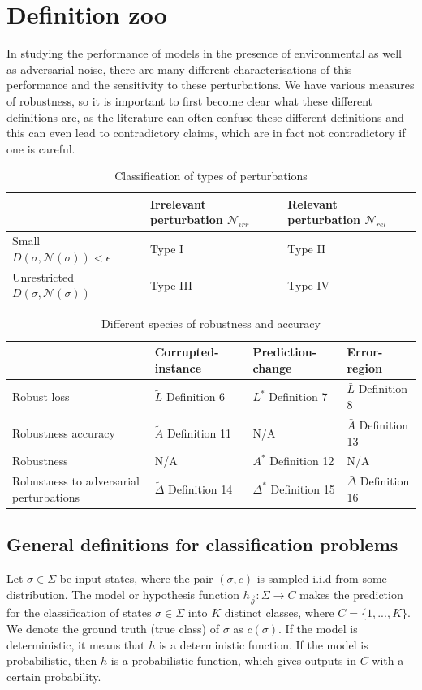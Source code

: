 \documentclass[onecolumn,prx, superscriptaddress,longbibliography,margin=1mm 11pt]{revtex4-2}
\begin{document}
\section{Definition zoo}\label{sec:xref}
In studying the performance of models in the presence of environmental as well as adversarial noise, there are many different characterisations of this performance and the sensitivity to these perturbations. We have various measures of robustness, so it is important to first become clear what these different definitions are, as the literature can often confuse these different definitions and this can even lead to contradictory claims, which are in fact not contradictory if one is careful. 

\begin{table}[]
\caption{Classification of types of perturbations}
\begin{tabular}{|l|l|l|}
\hline
 & Irrelevant perturbation $\mathcal{N}_{irr}$ & Relevant perturbation $\mathcal{N}_{rel}$ \\ \hline
Small $D(\sigma, \mathcal{N}(\sigma))<\epsilon$ & Type I & Type II  \\ \hline
 Unrestricted $D(\sigma, \mathcal{N}(\sigma))$ & Type III & Type IV \\ \hline
\end{tabular}
\end{table}


\begin{table}[]
\caption{Different species of robustness and accuracy}
\begin{tabular}{|l|l|l|l|}
\hline
 & Corrupted-instance & Prediction-change & Error-region \\ \hline
Robust loss & $\tilde{L}$ \quad Definition 6 & $L^*$ \quad Definition 7 & $\bar{L}$ \quad Definition 8 \\ \hline
Robustness accuracy & $\tilde{A}$ \quad Definition 11 & N/A &  $\bar{A}$ \quad Definition 13\\ \hline
Robustness & N/A & $A^*$ \quad Definition 12  & N/A  \\ \hline
Robustness to adversarial perturbations & $\tilde{\Delta}$ \quad Definition 14 & $\Delta^*$ \quad Definition 15 & $\bar{\Delta}$ \quad Definition 16  \\ \hline
\end{tabular}
\end{table}

\subsection{General definitions for classification problems}
Let $\sigma \in \Sigma$ be input states, where the pair $(\sigma, c)$ is sampled i.i.d from some distribution.  The model or hypothesis function $h_{\vec \theta}:\Sigma \rightarrow C$ makes the prediction for the classification of states $\sigma \in \Sigma$ into $K$ distinct classes, where $C=\{1,...,K\}$. We denote the ground truth (true class) of $\sigma$ as $c(\sigma)$. If the model is deterministic, it means that $h$ is a deterministic function. If the model is probabilistic, then $h$ is a probabilistic function, which gives outputs in $C$ with a certain probability.\\
\end{document}
